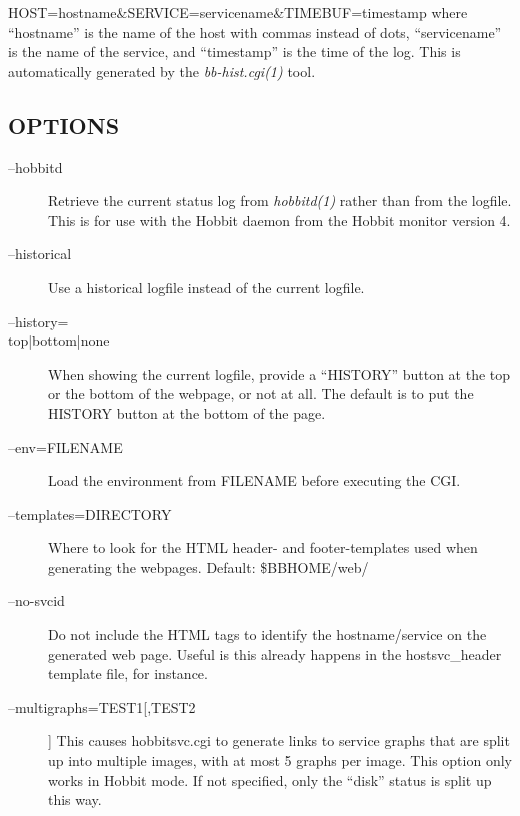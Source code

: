 HOST=hostname\&SERVICE=servicename\&TIMEBUF=timestamp  
 where ``hostname'' is the name of the host with commas instead of dots, ``servicename'' is the name of the service, and ``timestamp'' is the time of the log. This is automatically generated by the \emph{bb-hist.cgi(1)}
 tool. 



\subsection{OPTIONS}
\begin{description}
\item[--hobbitd] Retrieve the current status log from \emph{hobbitd(1)}
 rather than from the logfile. This is for use with the Hobbit daemon from the Hobbit monitor version 4. 

 

\item[--historical] Use a historical logfile instead of the current logfile. 

 

\item[--history=\\{top|bottom|none\\}] When showing the current logfile, provide a ``HISTORY'' button at the top or the bottom of the webpage, or not at all. The default is to put the HISTORY button at the bottom of the page. 

 

\item[--env=FILENAME] Load the environment from FILENAME before executing the CGI. 

 

\item[--templates=DIRECTORY] Where to look for the HTML header- and footer-templates used when generating the webpages. Default: \$BBHOME/web/ 

 

\item[--no-svcid] Do not include the HTML tags to identify the hostname/service on the generated web page. Useful is this already happens in the hostsvc\_header template file, for instance. 

 

\item[--multigraphs=TEST1[,TEST2]] This causes hobbitsvc.cgi to generate links to service graphs that are split up into multiple images, with at most 5 graphs per image. This option only works in Hobbit mode. If not specified, only the ``disk'' status is split up this way. 


\end{description}
